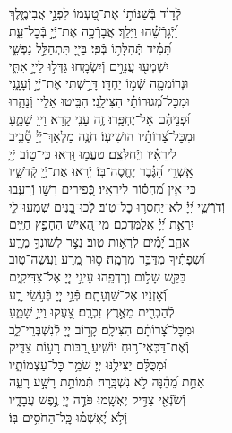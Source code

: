 \documentclass[twoside, openany, parskip=half, 11pt]{book}
\begin{document}
\begin{narrow}
לְֿדָוִ֗ד \hfill
בְּֿשַׁנּוֹת֣וֹ אֶת־טַ֭עְמוֹ לִפְנֵ֣י אֲבִימֶ֑לֶךְ\\ וַ֝יְֿגָרְֿשֵׁ֗הוּ וַיֵּלַֽךְ׃ \hfill
אֲבָרְֿכָ֣ה אֶת־יְֿיָ֣ בְּֿכׇל־עֵ֑ת \\ תָּ֝מִ֗יד תְּֽֿהִלָּת֥וֹ בְּֿפִֽי׃ \hfill
בַּייָ֭ תִּתְהַלֵּ֣ל נַפְשִׁ֑י\\ יִשְׁמְע֖וּ עֲנָוִ֣ים וְֿיִשְׂמָֽחוּ׃ \hfill
גַּדְּל֣וּ לַייָ֣ אִתִּ֑י\\ וּנְרוֹמְמָ֖ה שְֿׁמ֣וֹ יַחְדָּֽו׃ \hfill
דָּרַ֣שְׁתִּי אֶת־יְֿיָ֣ וְֿעָנָ֑נִי\\ וּמִכׇּל־מְ֝גוּרוֹתַ֗י הִצִּילָֽנִי׃ \hfill
הִבִּ֣יטוּ אֵלָ֣יו וְֿנָהָ֑רוּ\\ וּ֝פְנֵיהֶ֗ם אַל־יֶחְפָּֽרוּ׃ \hfill
זֶ֤ה עָנִ֣י קָ֭רָא וַייָ֣ שָׁמֵ֑עַ\\ וּמִכׇּל־צָ֝רוֹתָ֗יו הוֹשִׁיעֽוֹ׃ \hfill
חֹנֶ֤ה מַלְאַךְ־יְֿיָ֓ סָ֘בִ֤יב\\ לִירֵאָ֗יו וַֽיְֿחַלְּצֵֽם׃ \hfill
טַעֲמ֣וּ וּ֭רְאוּ כִּֽי־ט֣וֹב יְֿיָ֑\\ אַֽשְׁרֵ֥י הַ֝גֶּ֗בֶר יֶחֱסֶה־בּֽוֹ׃ \hfill
יְֿר֣אוּ אֶת־יְֿיָ֣ קְֿדֹשָׁ֑יו\\ כִּי־אֵ֥ין מַ֝חְס֗וֹר לִירֵאָֽיו׃ \hfill
כְּֿ֭פִירִים רָשׁ֣וּ וְֿרָעֵ֑בוּ\\ וְֿדֹרְֿשֵׁ֥י יְ֝יָ֗ לֹא־יַחְסְר֥וּ כׇל־טֽוֹב׃ \hfill
לְֽֿכוּ־בָ֭נִים שִׁמְעוּ־לִ֑י\\ יִֽרְאַ֥ת יְ֝יָ֗ אֲלַמֶּדְכֶֽם׃ \hfill
מִֽי־הָ֭אִישׁ הֶחָפֵ֣ץ חַיִּ֑ים\\ אֹהֵ֥ב יָ֝מִ֗ים לִרְא֥וֹת טֽוֹב׃ \hfill
נְֿצֹ֣ר לְֿשׁוֹנְֿךָ֣ מֵרָ֑ע\\ וּ֝שְׂפָתֶ֗יךָ מִדַּבֵּ֥ר מִרְמָֽה׃ \hfill
ס֣וּר מֵ֭רָע וַעֲשֵׂה־ט֑וֹב\\ בַּקֵּ֖שׁ שָׁל֣וֹם וְֿרׇדְפֵֽהוּ׃ \hfill
עֵינֵ֣י יְיָ֭ אֶל־צַדִּיקִ֑ים\\ וְֿ֝אׇזְנָ֗יו אֶל־שַׁוְעָתָֽם׃ \hfill
פְּֿנֵ֣י יְיָ֭ בְּֿעֹ֣שֵׂי רָ֑ע\\ לְֿהַכְרִ֖ית מֵאֶ֣רֶץ זִכְרָֽם׃ \hfill
צָ֭עֲקוּ וַייָ֣ שָׁמֵ֑עַ\\ וּמִכׇּל־צָ֝רוֹתָ֗ם הִצִּילָֽם׃ \hfill
קָר֣וֹב יְיָ֭ לְֿנִשְׁבְּרֵי־לֵ֑ב\\ וְֽֿאֶת־דַּכְּאֵי־ר֥וּחַ יוֹשִֽׁיעַ׃ \hfill
רַ֭בּוֹת רָע֣וֹת צַדִּ֑יק\\ וּ֝מִכֻּלָּ֗ם יַצִּילֶ֥נּוּ יְיָ׃ \hfill
שֹׁמֵ֥ר כׇּל־עַצְמוֹתָ֑יו\\ אַחַ֥ת מֵ֝הֵ֗נָּה לֹ֣א נִשְׁבָּֽרָה׃ \hfill
תְּֿמוֹתֵ֣ת רָשָׁ֣ע רָעָ֑ה\\ וְֿשֹׂנְֿאֵ֖י צַדִּ֣יק יֶאְשָֽׁמוּ׃ \hfill
פֹּדֶ֣ה יְיָ֭ נֶ֣פֶשׁ עֲבָדָ֑יו\\ וְֿלֹ֥א יֶ֝אְשְׁמ֗וּ \hfill כׇּֽל־הַחֹסִ֥ים בּֽוֹ׃ \\




\end{narrow}
\end{document}
